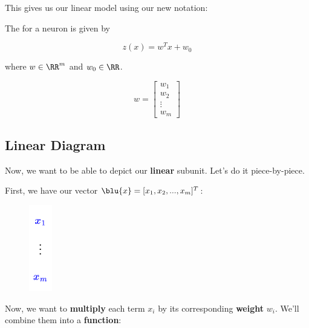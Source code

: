         This gives us our linear model using our new notation:\\
        
        \begin{definition}
            The  for a neuron is given by
            
            \begin{equation*}
                z(x) = w^Tx + w_0
            \end{equation*}
            
            where $w \in \RR^m$ and $w_0 \in \RR$.
            
            \begin{equation*}
                w = 
                    \begin{bmatrix}
                      w_1 \\ w_2 \\ \vdots \\ w_m
                    \end{bmatrix}
            \end{equation*}
        \end{definition}
    
    \subsection{Linear Diagram}
    
        Now, we want to be able to depict our \textbf{linear} subunit. Let's do it piece-by-piece.
        
        First, we have our vector $\blu{x} = [x_1, x_2, ..., x_m]^T$:
        
        \begin{figure}[H]
            \centering
            \includegraphics[width=10mm,scale=0.4]{images/nn_images/x_vector.png}
        \end{figure}
        
        Now, we want to \textbf{multiply} each term $x_i$ by its corresponding \textbf{weight} $w_i$. We'll combine them into a \textbf{function}:
        
